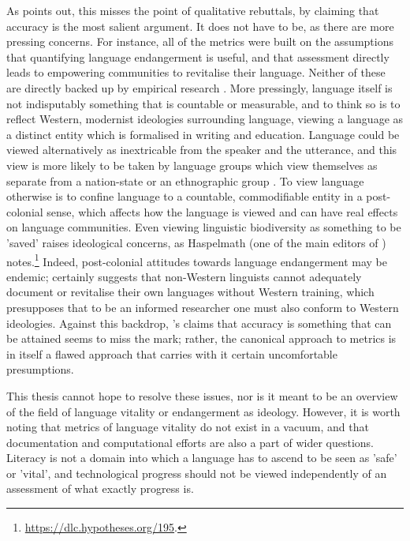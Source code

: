 As \citet{grenoble2016response} points out, this misses the point of qualitative rebuttals, by claiming that accuracy is the most salient argument. It does not have to be, as there are more pressing concerns. For instance, all of the metrics were built on the assumptions that quantifying language endangerment is useful, and that assessment directly leads to empowering communities to revitalise their language. Neither of these are directly backed up by empirical research \citep{grenoble2016response}. More pressingly, language itself is not indisputably something that is countable or measurable, and to think so is to reflect Western, modernist ideologies surrounding language, viewing a language as a distinct entity which is formalised in writing and education. Language could be viewed alternatively as inextricable from the speaker and the utterance, and this view is more likely to be taken by language groups which view themselves as separate from a nation-state or an ethnographic group \citep{bodo2017language}. To view language otherwise is to confine language to a countable, commodifiable entity in a post-colonial sense, which affects how the language is viewed and can have real effects on language communities. Even viewing linguistic biodiversity as something to be 'saved' raises ideological  concerns, as Haspelmath (one of the main editors of \citet{wals}) notes.\footnote{\href{https://dlc.hypotheses.org/195}{https://dlc.hypotheses.org/195}. } Indeed, post-colonial attitudes towards language endangerment may be endemic; \citet{newman1998we} certainly suggests that non-Western linguists cannot adequately document or revitalise their own languages without Western training, which presupposes that to be an informed researcher one must also conform to Western ideologies. Against this backdrop, \citet{lee2016assessing}'s claims that accuracy is something that can be attained seems to miss the mark; rather, the canonical approach to metrics is in itself a flawed approach that carries with it certain uncomfortable presumptions.

This thesis cannot hope to resolve these issues, nor is it meant to be an overview of the field of language vitality or endangerment as ideology. However, it is worth noting that metrics of language vitality do not exist in a vacuum, and that documentation and computational efforts are also a part of wider questions. Literacy is not a domain into which a language has to ascend to be seen as 'safe' or 'vital', and technological progress should not be viewed independently of an assessment of what exactly progress is.

